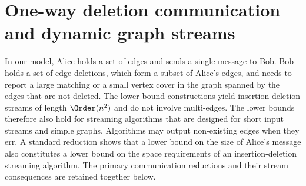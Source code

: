 \section*{One-way deletion communication and dynamic graph streams}
In our model, Alice holds a set of edges and sends a single message to Bob. Bob holds a set of edge deletions, which form a subset of Alice's edges, and needs to report a large matching or a small vertex cover in the graph spanned by the edges that are not deleted.
The lower bound constructions yield insertion-deletion streams of length $\Order(n^2)$ and do not involve multi-edges. The lower bounds therefore also hold for streaming algorithms that are designed for short input streams and simple graphs. Algorithms may output non-existing edges when they err.
A standard reduction shows that a lower bound on the size of Alice's message also constitutes a lower bound on the space requirements of an insertion-deletion streaming algorithm. The primary communication reductions and their stream consequences are retained together below.
